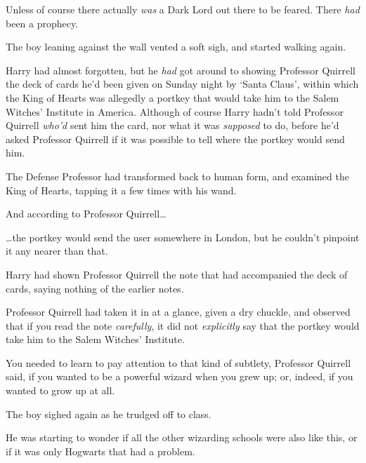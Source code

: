 Unless of course there actually \emph{was} a Dark Lord out there to be feared. There \emph{had} been a prophecy.

The boy leaning against the wall vented a soft sigh, and started walking again.

Harry had almost forgotten, but he \emph{had} got around to showing Professor Quirrell the deck of cards he'd been given on Sunday night by `Santa Claus', within which the King of Hearts was allegedly a portkey that would take him to the Salem Witches' Institute in America. Although of course Harry hadn't told Professor Quirrell \emph{who'd} sent him the card, nor what it was \emph{supposed} to do, before he'd asked Professor Quirrell if it was possible to tell where the portkey would send him.

The Defense Professor had transformed back to human form, and examined the King of Hearts, tapping it a few times with his wand.

And according to Professor Quirrell{\ldots}

{\ldots}the portkey would send the user somewhere in London, but he couldn't pinpoint it any nearer than that.

Harry had shown Professor Quirrell the note that had accompanied the deck of cards, saying nothing of the earlier notes.

Professor Quirrell had taken it in at a glance, given a dry chuckle, and observed that if you read the note \emph{carefully}, it did not \emph{explicitly} say that the portkey would take him to the Salem Witches' Institute.

You needed to learn to pay attention to that kind of subtlety, Professor Quirrell said, if you wanted to be a powerful wizard when you grew up; or, indeed, if you wanted to grow up at all.

The boy sighed again as he trudged off to class.

He was starting to wonder if all the other wizarding schools were also like this, or if it was only Hogwarts that had a problem.

